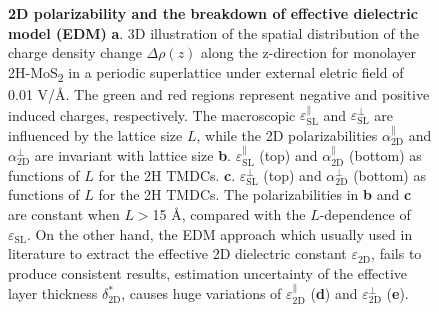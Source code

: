 % 

\label{sec:org34cbe74}
\begin{figure}[H]
\centering
\caption{\label{fig-1} \textbf{2D polarizability and the breakdown of
    effective dielectric model
    (EDM)} %
  \textbf{a}. 3D illustration of the spatial distribution of the
  charge density change $\Delta \rho(z)$ along the z-direction for
  monolayer 2H-MoS\textsubscript{2} in a periodic superlattice under
  external eletric field of 0.01 V/\AA{}.  The green and red regions
  represent negative and positive induced charges, respectively. The
  macroscopic $\varepsilon_{\mathrm{SL}}^{\parallel}$ and
  $\varepsilon_{\mathrm{SL}}^{\perp}$ are influenced by the lattice
  size $L$, while the 2D polarizabilities
  $\alpha_{\mathrm{2D}}^{\parallel}$ and
  $\alpha_{\mathrm{2D}}^{\perp}$ are invariant with lattice size
  \textbf{b}.  $\varepsilon^{\parallel}_{\mathrm{SL}}$ (top) and
  $\alpha_{\mathrm{2D}}^{\parallel}$ (bottom) as functions of $L$ for
  the 2H TMDCs. \textbf{c}.  $\varepsilon^{\perp}_{\mathrm{SL}}$ (top)
  and $\alpha_{\mathrm{2D}}^{\perp}$ (bottom) as functions of $L$ for
  the 2H TMDCs. The polarizabilities in \textbf{b} and \textbf{c} are
  constant when $L>$15 \AA{}, compared with the $L$-dependence of
  $\varepsilon_{\mathrm{SL}}$. On the other hand, the EDM approach
  which usually used in literature to extract the effective 2D
  dielectric constant $\varepsilon_{\mathrm{2D}}$, fails to produce
  consistent results, estimation uncertainty of the effective layer
  thickness $\delta^{*}_{\mathrm{2D}}$, causes huge variations of
  $\varepsilon_{\mathrm{2D}}^{\parallel}$ (\textbf{d}) and
  $\varepsilon_{\mathrm{2D}}^{\perp}$ (\textbf{e}).
}
\end{figure}


